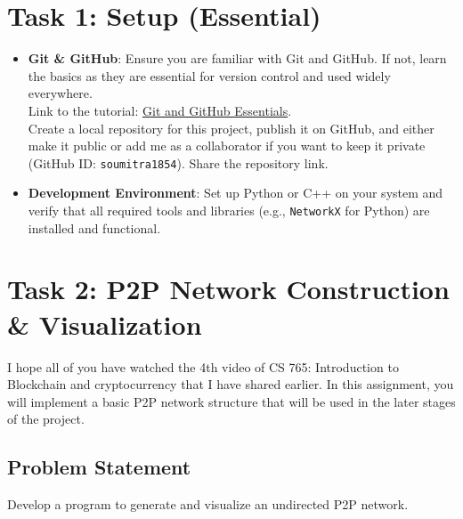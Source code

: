 \documentclass[12pt]{extarticle}
\begin{document}
\section*{Task 1: Setup (Essential)}
\begin{itemize}
    \item \textbf{Git \& GitHub}: Ensure you are familiar with Git and GitHub. If not, learn the basics as they are essential for version control and used widely everywhere.\\Link to the tutorial: \href{https://youtu.be/tRZGeaHPoaw?si=KTOgtqin7e2d0rI8}{Git and GitHub Essentials}.\\ Create a local repository for this project, publish it on GitHub, and either make it public or add me as a collaborator if you want to keep it private (GitHub ID: \texttt{soumitra1854}). Share the repository link.
    \item \textbf{Development Environment}: Set up Python or C++ on your system and verify that all required tools and libraries (e.g., \texttt{NetworkX} for Python) are installed and functional.
\end{itemize}

\section*{Task 2: P2P Network Construction \& Visualization}
I hope all of you have watched the 4th video of CS 765: Introduction to Blockchain and cryptocurrency that I have shared earlier. In this assignment, you will implement a basic P2P network structure that will be used in the later stages of the project.
\subsection*{Problem Statement}
Develop a program to generate and visualize an undirected P2P network.
\end{document}
